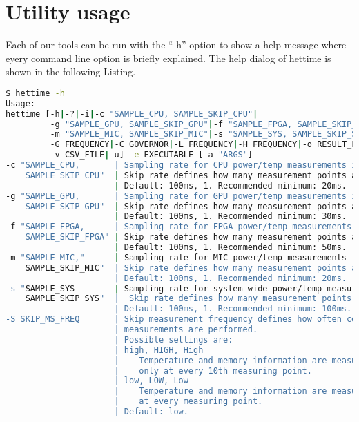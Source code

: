 \section{Utility usage}
\label{app:manpage}
Each of our tools can be run with the ``-h'' option to show a help message where eyery command line option is briefly explained. The help dialog of hettime is shown in the following Listing. 
\begin{lstlisting}[language=sh,basicstyle=\tiny,stringstyle=\color{black},keywordstyle=\color{black}]
$ hettime -h
Usage:
hettime [-h|-?|-i|-c "SAMPLE_CPU, SAMPLE_SKIP_CPU"|
		 -g "SAMPLE_GPU, SAMPLE_SKIP_GPU"|-f "SAMPLE_FPGA, SAMPLE_SKIP_FPGA"|
         -m "SAMPLE_MIC, SAMPLE_SKIP_MIC"|-s "SAMPLE_SYS, SAMPLE_SKIP_SYS"|
         -G FREQUENCY|-C GOVERNOR|-L FREQUENCY|-H FREQUENCY|-o RESULT_FILE|
         -v CSV_FILE|-u] -e EXECUTABLE [-a "ARGS"]
-c "SAMPLE_CPU,       | Sampling rate for CPU power/temp measurements in ms.
    SAMPLE_SKIP_CPU"  | Skip rate defines how many measurement points are skipped.
                      | Default: 100ms, 1. Recommended minimum: 20ms.
-g "SAMPLE_GPU,       | Sampling rate for GPU power/temp measurements in ms.
    SAMPLE_SKIP_GPU"  | Skip rate defines how many measurement points are skipped.
                      | Default: 100ms, 1. Recommended minimum: 30ms.
-f "SAMPLE_FPGA,      | Sampling rate for FPGA power/temp measurements in ms.
    SAMPLE_SKIP_FPGA" | Skip rate defines how many measurement points are skipped.
                      | Default: 100ms, 1. Recommended minimum: 50ms.
-m "SAMPLE_MIC,"      | Sampling rate for MIC power/temp measurements in ms.
    SAMPLE_SKIP_MIC"  | Skip rate defines how many measurement points are skipped.
                      | Default: 100ms, 1. Recommended minimum: 20ms.
-s "SAMPLE_SYS        | Sampling rate for system-wide power/temp measurements in ms.
    SAMPLE_SKIP_SYS"  |  Skip rate defines how many measurement points are skipped.
                      | Default: 100ms, 1. Recommended minimum: 100ms.
-S SKIP_MS_FREQ       | Skip measurement frequency defines how often certain
					  | measurements are performed.
                      | Possible settings are:
                      | high, HIGH, High
                      |    Temperature and memory information are measured
                      |    only at every 10th measuring point.
                      | low, LOW, Low
                      |    Temperature and memory information are measured
                      |    at every measuring point.
                      | Default: low.

\end{lstlisting}
